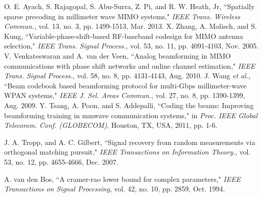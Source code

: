 \documentclass[conference]{IEEEtran}
\begin{document}
\begin{thebibliography}{1}
O. E. Ayach, S. Rajagopal, S. Abu-Surra, Z. Pi, and R. W. Heath, Jr, ``Spatially sparse precoding in millimeter wave MIMO systems," {\it IEEE Trans. Wireless Commun.}, vol. 13, no. 3, pp. 1499-1513, Mar. 2013.
X. Zhang, A. Molisch, and S. Kung, ``Variable-phase-shift-based RF-baseband codesign for MIMO antenna selection," {\it IEEE Trans. Signal Process.}, vol. 53, no. 11, pp. 4091-4103, Nov. 2005.
V. Venkateswaran and A. van der Veen, ``Analog beamforming in MIMO communications with phase shift networks and online channel estimation," {\it IEEE Trans. Signal Process.}, vol. 58, no. 8, pp. 4131-4143, Aug. 2010.
J. Wang {\it et al.}, ``Beam codebook based beamforming protocol for multi-Gbps millimeter-wave WPAN systems," {\it IEEE J. Sel. Areas Commun.}, vol. 27, no. 8, pp. 1390-1399, Aug. 2009.
Y. Tsang, A. Poon, and S. Addepalli, ``Coding the beams: Improving beamforming training in mmwave communication systems," in {\it Proc. IEEE Global Telecomm. Conf. (GLOBECOM)}, Houston, TX, USA, 2011, pp. 1-6.


J. A. Tropp, and A. C. Gilbert, ``Signal recovery from random measurements via orthogonal matching pursuit," {\it IEEE Transactions on Information Theory.}, vol. 53, no. 12, pp. 4655-4666, Dec. 2007.


A. van den Bos, ``A cramer-rao lower bound for complex parameters," {\it IEEE Transactions on Signal Processing}, vol. 42, no. 10, pp. 2859, Oct. 1994.
\end{thebibliography}

\end{document}

